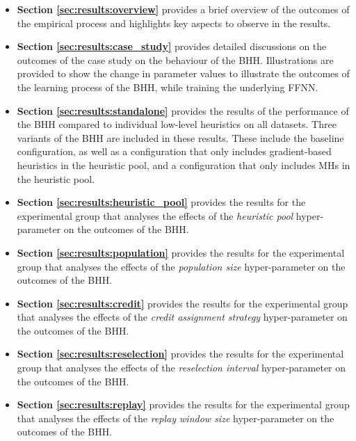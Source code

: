 \begin{itemize}
      \item \textbf{Section \ref{sec:results:overview}} provides a brief overview of the outcomes of the empirical process and highlights key aspects to observe in the results.

      \item \textbf{Section \ref{sec:results:case_study}} provides detailed discussions on the outcomes of the case study on the behaviour of the \acs{BHH}. Illustrations are provided to show the change in parameter values to illustrate the outcomes of the learning process of the \acs{BHH}, while training the underlying \acf{FFNN}.

      \item \textbf{Section \ref{sec:results:standalone}} provides the results of the performance of the \acs{BHH} compared to individual low-level heuristics on all datasets. Three variants of the \acs{BHH} are included in these results. These include the baseline configuration, as well as a configuration that only includes gradient-based heuristics in the heuristic pool, and a configuration that only includes \acp{MH} in the heuristic pool.

      \item \textbf{Section \ref{sec:results:heuristic_pool}} provides the results for the experimental group that analyses the effects of the \textit{heuristic pool} hyper-parameter on the outcomes of the \acs{BHH}.

      \item \textbf{Section \ref{sec:results:population}} provides the results for the experimental group that analyses the effects of the \textit{population size} hyper-parameter on the outcomes of the \acs{BHH}.

      \item \textbf{Section \ref{sec:results:credit}} provides the results for the experimental group that analyses the effects of the \textit{credit assignment strategy} hyper-parameter on the outcomes of the \acs{BHH}.

      \item \textbf{Section \ref{sec:results:reselection}} provides the results for the experimental group that analyses the effects of the \textit{reselection interval} hyper-parameter on the outcomes of the \acs{BHH}.

      \item \textbf{Section \ref{sec:results:replay}} provides the results for the experimental group that analyses the effects of the \textit{replay window size} hyper-parameter on the outcomes of the \acs{BHH}.


\end{itemize}
